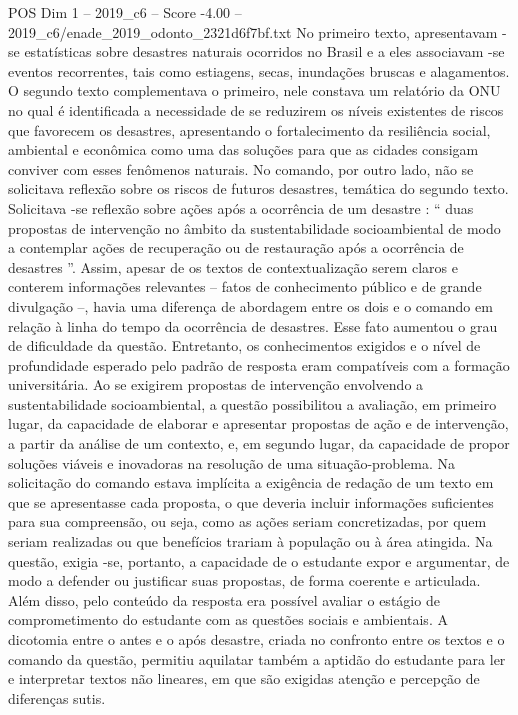 \begin{textsample}{POS Dim 1 – 2019\_c6 – Score -4.00 – 2019\_c6/enade\_2019\_odonto\_2321d6f7bf.txt}
No primeiro texto, apresentavam -se estatísticas sobre desastres naturais ocorridos no Brasil e a eles associavam -se eventos recorrentes, tais como estiagens, secas, inundações bruscas e alagamentos.
O segundo texto complementava o primeiro, nele constava um relatório da ONU no qual é identificada a necessidade de se reduzirem os níveis existentes de riscos que favorecem os desastres, apresentando o fortalecimento da resiliência social, ambiental e econômica como uma das soluções para que as cidades consigam conviver com esses fenômenos naturais.
No comando, por outro lado, não se solicitava reflexão sobre os riscos de futuros desastres, temática do segundo texto.
Solicitava -se reflexão sobre ações após a ocorrência de um desastre : “ duas propostas de intervenção no âmbito da sustentabilidade socioambiental de modo a contemplar ações de recuperação ou de restauração após a ocorrência de desastres ”.
Assim, apesar de os textos de contextualização serem claros e conterem informações relevantes – fatos de conhecimento público e de grande divulgação –, havia uma diferença de abordagem entre os dois e o comando em relação à linha do tempo da ocorrência de desastres.
Esse fato aumentou o grau de dificuldade da questão.
Entretanto, os conhecimentos exigidos e o nível de profundidade esperado pelo padrão de resposta eram compatíveis com a formação universitária.
Ao se exigirem propostas de intervenção envolvendo a sustentabilidade socioambiental, a questão possibilitou a avaliação, em primeiro lugar, da capacidade de elaborar e apresentar propostas de ação e de intervenção, a partir da análise de um contexto, e, em segundo lugar, da capacidade de propor soluções viáveis e inovadoras na resolução de uma situação-problema.
Na solicitação do comando estava implícita a exigência de redação de um texto em que se apresentasse cada proposta, o que deveria incluir informações suficientes para sua compreensão, ou seja, como as ações seriam concretizadas, por quem seriam realizadas ou que benefícios trariam à população ou à área atingida.
Na questão, exigia -se, portanto, a capacidade de o estudante expor e argumentar, de modo a defender ou justificar suas propostas, de forma coerente e articulada.
Além disso, pelo conteúdo da resposta era possível avaliar o estágio de comprometimento do estudante com as questões sociais e ambientais.
A dicotomia entre o antes e o após desastre, criada no confronto entre os textos e o comando da questão, permitiu aquilatar também a aptidão do estudante para ler e interpretar textos não lineares, em que são exigidas atenção e percepção de diferenças sutis.

\end{textsample}
